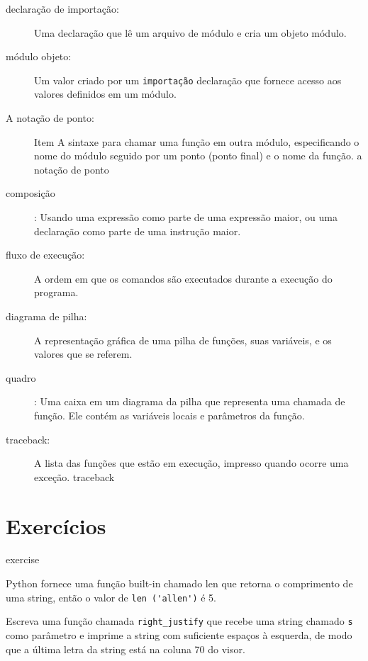 \documentclass[10pt]{book}
\begin{document}
\begin{exercise}
\begin{description}
\item[declaração de importação:] Uma declaração que lê um arquivo de módulo e cria
um objeto módulo.

\item[módulo objeto:] Um valor criado por um {\tt importação} declaração
que fornece acesso aos valores definidos em um módulo.

\item[A notação de ponto:] Item A sintaxe para chamar uma função em outra
módulo, especificando o nome do módulo seguido por um ponto (ponto final) e
o nome da função.
\index{} a notação de ponto

\item[composição]: Usando uma expressão como parte de uma expressão maior,
ou uma declaração como parte de uma instrução maior.

\item[fluxo de execução:] A ordem em que os comandos são executados durante
a execução do programa.

\item[diagrama de pilha:] A representação gráfica de uma pilha de funções,
suas variáveis, e os valores que se referem.

\item[quadro]: Uma caixa em um diagrama da pilha que representa uma chamada de função.
Ele contém as variáveis ​​locais e parâmetros da função.

\item[traceback:] A lista das funções que estão em execução,
impresso quando ocorre uma exceção.
\index{} traceback


\end{description}


\section{Exercícios}

\begin{} exercise

Python fornece uma função built-in chamado {len \tt} que
retorna o comprimento de uma string, então o valor de \verb "len ('allen')" é 5.

Escreva uma função chamada \verb "right_justify" que recebe uma string
chamado {\tt s} como parâmetro e imprime a string com suficiente
espaços à esquerda, de modo que a última letra da string está na coluna 70
do visor.


\end{}
\end{exercise}
\end{document}
